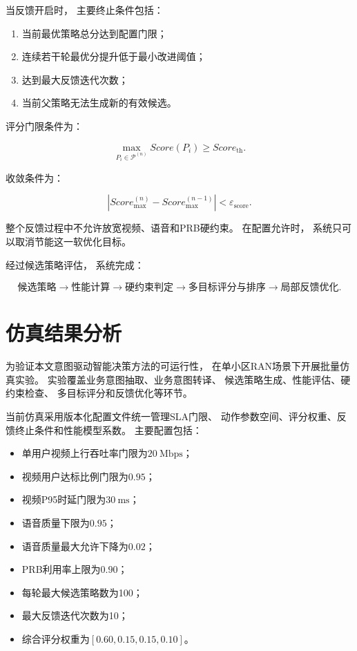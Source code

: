 \documentclass[lang=cn,12pt]{elegantbook}
\begin{document}
当反馈开启时，
主要终止条件包括：

\begin{enumerate}[label=\arabic*)]
    \item 当前最优策略总分达到配置门限；
    \item 连续若干轮最优分提升低于最小改进阈值；
    \item 达到最大反馈迭代次数；
    \item 当前父策略无法生成新的有效候选。
\end{enumerate}

评分门限条件为：

\begin{equation}
\max_{P_i\in\mathcal{P}^{(n)}}
Score(P_i)
\geq
Score_{\mathrm{th}}.
\label{eq:score_threshold_stop_reduced}
\end{equation}

收敛条件为：

\begin{equation}
\left|
Score_{\max}^{(n)}
-
Score_{\max}^{(n-1)}
\right|
<
\varepsilon_{\mathrm{score}}.
\label{eq:score_convergence_reduced}
\end{equation}

整个反馈过程中不允许放宽视频、语音和PRB硬约束。
在配置允许时，
系统只可以取消节能这一软优化目标。

经过候选策略评估，
系统完成：

\begin{equation}
\text{候选策略}
\longrightarrow
\text{性能计算}
\longrightarrow
\text{硬约束判定}
\longrightarrow
\text{多目标评分与排序}
\longrightarrow
\text{局部反馈优化}.
\label{eq:candidate_policy_to_ranked_policy}
\end{equation}

\section{仿真结果分析}
\label{sec:simulation_results}

为验证本文意图驱动智能决策方法的可运行性，
在单小区RAN场景下开展批量仿真实验。
实验覆盖业务意图抽取、业务意图转译、
候选策略生成、性能评估、硬约束检查、
多目标评分和反馈优化等环节。

当前仿真采用版本化配置文件统一管理SLA门限、
动作参数空间、评分权重、反馈终止条件和性能模型系数。
主要配置包括：

\begin{itemize}
    \item 单用户视频上行吞吐率门限为$20~\mathrm{Mbps}$；
    \item 视频用户达标比例门限为$0.95$；
    \item 视频P95时延门限为$30~\mathrm{ms}$；
    \item 语音质量下限为$0.95$；
    \item 语音质量最大允许下降为$0.02$；
    \item PRB利用率上限为$0.90$；
    \item 每轮最大候选策略数为100；
    \item 最大反馈迭代次数为10；
    \item 综合评分权重为$[0.60,0.15,0.15,0.10]$。
\end{itemize}
\end{document}

